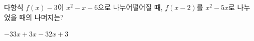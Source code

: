 다항식 $f(x)-3$이 $x^2-x-6$으로 나누어떨어질 때, $f(x-2)$를 $x^2-5x$로 나누었을 때의 나머지는?
\begin{choices32}{$-3$}{$3$}{$x+3$}{$x-3$}{$2x+3$}\end{choices32}
